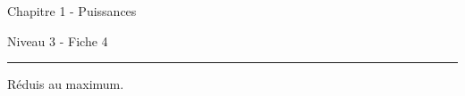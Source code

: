 \documentclass[12pt,parskip=half-, twoside=semi]{scrartcl}
\begin{document}
\begin{exercise}
\begin{enumerate}[cols=3]
  \end{enumerate}
\end{exercise}



\newpage
\begin{center}
  \bfseries
  \begin{Huge}
    Chapitre 1 - Puissances
  \end{Huge}
  \smallbreak
  \begin{large}
    Niveau 3  - Fiche 4
  \end{large}
  \smallbreak
  \rule[10pt]{.5\linewidth}{1 pt}
\end{center}

\setcounter{exercise}{0}

\begin{exercise}
  Réduis au maximum.
  \begin{enumerate}[cols=3]


\end{enumerate}
\end{exercise}
\end{document}
